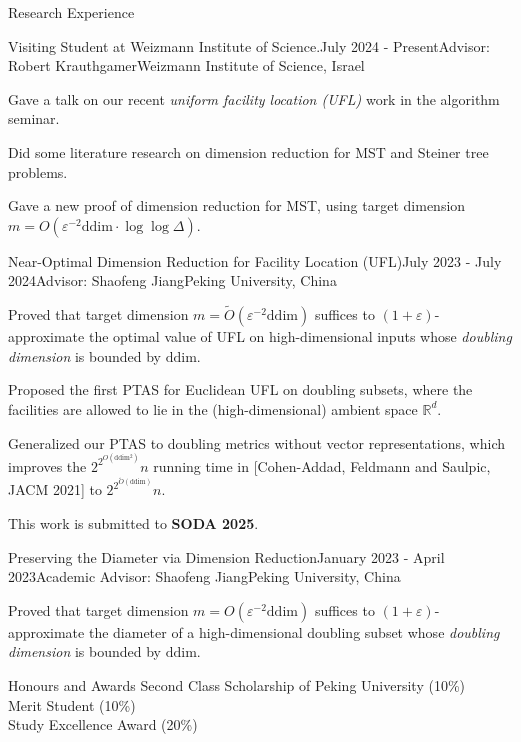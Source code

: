 \documentclass{resume} %
\begin{document}
\begin{rSection}{Research Experience}{}
    \begin{rSubsection}{Visiting Student at Weizmann Institute of Science.}{July 2024 - Present}{Advisor: Robert Krauthgamer}{Weizmann Institute of Science, Israel}
        \item Gave a talk on our recent \emph{uniform facility location (UFL)} work in the algorithm seminar.
        \item Did some literature research on dimension reduction for MST and Steiner tree problems.
        \item Gave a new proof of dimension reduction for MST, using target dimension $m = O(\varepsilon^{-2} \mathrm{ddim} \cdot \log\log \Delta)$.
    \end{rSubsection}

    \begin{rSubsection}{Near-Optimal Dimension Reduction for Facility Location (UFL)}{July 2023 - July 2024}{Advisor: Shaofeng Jiang}{Peking University, China}
       \item Proved that target dimension $m = \tilde{O}(\varepsilon^{-2} \mathrm{ddim})$ suffices to $(1+\varepsilon)$-approximate the optimal value of UFL on high-dimensional inputs whose \emph{doubling dimension} is bounded by $\mathrm{ddim}$.
       \item Proposed the first PTAS for Euclidean UFL on doubling subsets, where the facilities are allowed to lie in the (high-dimensional) ambient space $\mathbb{R}^d$.
       \item Generalized our PTAS to doubling metrics without vector representations, which improves the $2^{2^{O(\mathrm{ddim^2})}} n$ running time in [Cohen-Addad, Feldmann and Saulpic, JACM 2021] to $2^{2^{\tilde O(\mathrm{ddim})}} n$.
       \item This work is submitted to {\bf SODA 2025}.
    \end{rSubsection}

    \begin{rSubsection}{Preserving the Diameter via Dimension Reduction}{January 2023 - April 2023}{Academic Advisor: Shaofeng Jiang}{Peking University, China}
        \item Proved that target dimension $m = O(\varepsilon^{-2} \mathrm{ddim})$ suffices to $(1+\varepsilon)$-approximate the diameter of a high-dimensional doubling subset whose \emph{doubling dimension} is bounded by $\mathrm{ddim}$.
    \end{rSubsection}
\end{rSection}

\begin{rSection}{Honours and Awards}{}
    Second Class Scholarship of Peking University (10\%) 
    \\ Merit Student (10\%) 
    \\ Study Excellence Award (20\%) 
\end{rSection}
\end{document}
